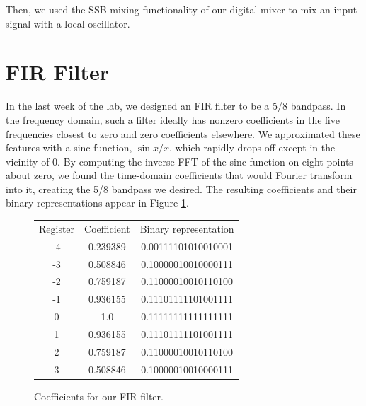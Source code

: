 \documentclass[11pt]{article}
\begin{document}

Then, we used the SSB mixing functionality of our digital mixer to mix an input signal %
with a local oscillator. %

\section{FIR Filter}

In the last week of the lab, we designed an FIR filter to be a 5/8 bandpass. In the frequency domain, such a filter ideally has nonzero coefficients in the five frequencies closest to zero and zero coefficients elsewhere. We approximated these features with a sinc function, $\sin{x}/x$, which rapidly drops off except in the vicinity of 0. By computing the inverse FFT of the sinc function on eight points about zero, we found the time-domain coefficients that would Fourier transform into it, creating the 5/8 bandpass we desired. The resulting coefficients and their binary representations appear in Figure \ref{table}.
\begin{figure}
\centering
\begin{tabular}{c|c|c}
Register & Coefficient & Binary representation \\
-4 & 0.239389 & 0.00111101010010001 \\
-3 & 0.508846 & 0.10000010010000111\\
-2 & 0.759187 & 0.11000010010110100\\
-1 & 0.936155 & 0.11101111101001111\\
0 & 1.0 & 0.11111111111111111\\
1 & 0.936155 & 0.11101111101001111\\
2 & 0.759187 & 0.11000010010110100\\
3 & 0.508846 & 0.10000010010000111\\
\end{tabular}
\caption{Coefficients for our FIR filter. \label{table}}
\end{figure}





\end{document}
